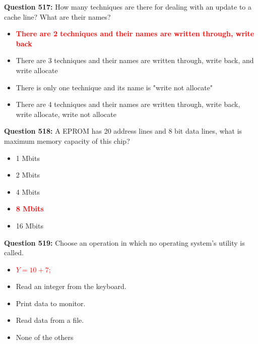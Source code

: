 \documentclass[12pt,a4paper]{article}
\begin{document}
\vspace{0.5cm}

\textbf{Question 517:} How many techniques are there for dealing with an update to a cache line? What are their names?

\begin{itemize}
    \item[\textbf{A.}] \textcolor{red}{\textbf{There are 2 techniques and their names are written through, write back}}
    \item[\textbf{B.}] There are 3 techniques and their names are written through, write back, and write allocate
    \item[\textbf{C.}] There is only one technique and its name is "write not allocate"
    \item[\textbf{D.}] There are 4 techniques and their names are written through, write back, write allocate, write not allocate
\end{itemize}

\vspace{0.5cm}

\textbf{Question 518:} A EPROM has 20 address lines and 8 bit data lines, what is maximum memory capacity of this chip?

\begin{itemize}
    \item[\textbf{A.}] 1 Mbits
    \item[\textbf{B.}] 2 Mbits
    \item[\textbf{C.}] 4 Mbits
    \item[\textbf{D.}] \textcolor{red}{\textbf{8 Mbits}}
    \item[\textbf{E.}] 16 Mbits
\end{itemize}

\vspace{0.5cm}

\textbf{Question 519:} Choose an operation in which no operating system's utility is called.

\begin{itemize}
    \item[\textbf{A.}] \textcolor{red}{\textbf{$Y = 10 + 7;$}}
    \item[\textbf{B.}] Read an integer from the keyboard.
    \item[\textbf{C.}] Print data to monitor.
    \item[\textbf{D.}] Read data from a file.
    \item[\textbf{E.}] None of the others
\end{itemize}
\end{document}
